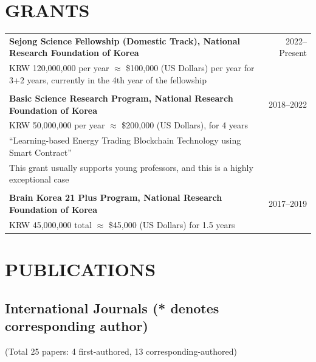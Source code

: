 \documentclass[11pt,a4paper]{article}
\begin{document}
\section{GRANTS}

\begin{tabular}{p{14cm}r}
\textbf{Sejong Science Fellowship (Domestic Track), National Research Foundation of Korea} & 2022--Present \\
KRW 120,000,000 per year $\approx$ \$100,000 (US Dollars) per year for 3+2 years, currently in the 4th year of the fellowship & \\
\\
\textbf{Basic Science Research Program, National Research Foundation of Korea} & 2018--2022 \\
KRW 50,000,000 per year $\approx$ \$200,000 (US Dollars), for 4 years & \\
``Learning-based Energy Trading Blockchain Technology using Smart Contract'' & \\
This grant usually supports young professors, and this is a highly exceptional case & \\
\\
\textbf{Brain Korea 21 Plus Program, National Research Foundation of Korea} & 2017--2019 \\
KRW 45,000,000 total $\approx$ \$45,000 (US Dollars) for 1.5 years & \\
\end{tabular}

\section{PUBLICATIONS}

\subsection{International Journals (* denotes corresponding author)}
(Total 25 papers: 4 first-authored, 13 corresponding-authored)
\end{document}

